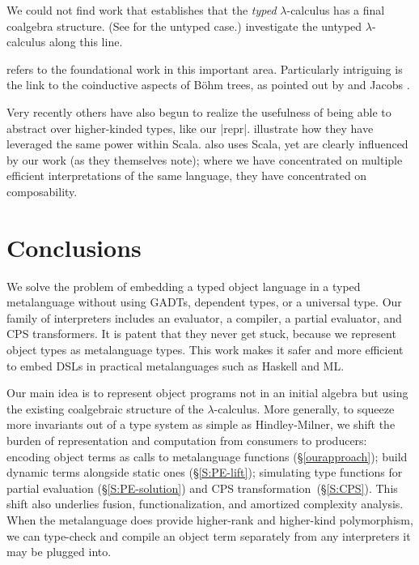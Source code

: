 We could not find work that establishes that
the \emph{typed} $\lambda$-calculus has a final coalgebra structure.
\ifshort
(See  for the untyped case.)
\else
{}
investigate the untyped $\lambda$-calculus
along this line.  
\begin{comment}
In particular, they use
contexts with a hole \citep[p.\,13]{honsell99coinductive} to define
\emph{observational equivalence}
(see our~\S\ref{selfinterp}).
\end{comment}
 refers to the
foundational work in this important area.  
Particularly intriguing is the link to the
coinductive aspects of B\"{o}hm trees, as pointed out by
\citet{berarducci-models} and Jacobs \citeyearpar[Example 4.3.4]{jacobs-coalgebra}.
\fi

Very recently others have also begun to realize the usefulness of being
able to abstract over higher-kinded types, like our |repr|.
 illustrate how they have leveraged the 
same power within Scala.   also uses Scala, yet are clearly
influenced by our work \citep{carette-kiselyov-shan-aplas}
(as they themselves note); where we have concentrated
on multiple efficient interpretations of the same language, they have 
concentrated on composability.

\section{Conclusions}\label{conclusion}

We solve the problem of embedding a typed object language in a typed
metalanguage without using GADTs, dependent types, or a universal type.
Our family of interpreters includes an evaluator, a compiler, a partial
evaluator, and CPS transformers.  It is patent that they never get stuck,
because we represent object types as metalanguage types.  This work
makes it safer and more efficient to embed DSLs
in practical metalanguages such as Haskell and ML\@.

Our main idea is to represent object programs not in an initial algebra
but using the existing coalgebraic structure of the $\lambda$-calculus.
More generally, to squeeze more invariants out of a type system as
simple as Hindley-Milner, we shift the burden of representation and
computation from consumers to producers: encoding object terms as calls
to metalanguage functions (\S\ref{ourapproach}); build dynamic terms
alongside static ones (\S\ref{S:PE-lift}); simulating type functions for
partial evaluation (\S\ref{S:PE-solution}) and CPS
transformation\ifshort\else~(\S\ref{S:CPS})\fi.
This shift also underlies fusion,
functionalization, and amortized complexity analysis.
\ifshort\else
When the metalanguage does provide higher-rank and higher-kind
polymorphism, we can type-check and compile an object term separately
from any interpreters it may be plugged into.
\fi

